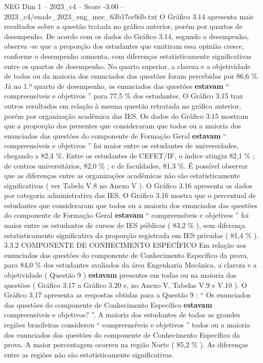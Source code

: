 \begin{textsample}{NEG Dim 1 – 2023\_c4 – Score -3.00 – 2023\_c4/enade\_2023\_eng\_mec\_63b17ce9db.txt}
O Gráfico 3.14 apresenta mais resultados sobre a questão tratada no gráfico anterior, porém por quartos de desempenho.
De acordo com os dados do Gráfico 3.14, segundo o desempenho, observa -se que a proporção dos estudantes que emitiram essa opinião cresce, conforme o desempenho aumenta, com diferenças estatisticamente significativas entre os quartos de desempenho.
No quarto superior, a clareza e a objetividade de todos ou da maioria dos enunciados das questões foram percebidas por 86,6 \%.
Já no 1.º quarto de desempenho, os enunciados das questões \textbf{estavam} “ compreensíveis e objetivos ” para 77,5 \% dos estudantes.
O Gráfico 3.15 traz outros resultados em relação à mesma questão retratada no gráfico anterior, porém por organização acadêmica das IES.
Os dados do Gráfico 3.15 mostram que a proporção dos presentes que consideraram que todos ou a maioria dos enunciados das questões do componente de Formação Geral \textbf{estavam} “ compreensíveis e objetivos ” foi maior entre os estudantes de universidades, chegando a 82,4 \%.
Entre os estudantes de CEFET/IF, o índice atingiu 82,1 \% ; de centros universitários, 82,0 \% ; e de faculdades, 81,3 \%.
É possível observar que as diferenças entre as organizações acadêmicas não são estatisticamente significativas ( ver Tabela V.8 no Anexo V ).
O Gráfico 3.16 apresenta os dados por categoria administrativa das IES.
O Gráfico 3.16 mostra que o percentual de estudantes que consideraram que todos ou a maioria dos enunciados das questões do componente de Formação Geral \textbf{estavam} “ compreensíveis e objetivos ” foi maior entre os estudantes de cursos de IES públicas ( 83,2 \% ), sem diferença estatisticamente significativa da proporção registrada em IES privadas ( 81,4 \% ). 3.3.2 COMPONENTE DE CONHECIMENTO ESPECÍFICO Em relação aos enunciados das questões do componente de Conhecimento Específico da prova, para 84,0 \% dos estudantes avaliados da área Engenharia Mecânica, a clareza e a objetividade ( Questão 9 ) \textbf{estavam} presentes em todas ou na maioria das questões ( Gráfico 3.17 a Gráfico 3.20 e, no Anexo V, Tabelas V.9 e V.10 ).
O Gráfico 3.17 apresenta as respostas obtidas para a Questão 9 : “ Os enunciados das questões do componente de Conhecimento Específico \textbf{estavam} compreensíveis e objetivos? ”.
A maioria dos estudantes de todas as grandes regiões brasileiras considerou “ compreensíveis e objetivos ” todos ou a maioria dos enunciados das questões do componente de Conhecimento Específico da prova.
A maior porcentagem ocorreu na região Norte ( 85,2 \% ).
As diferenças entre as regiões não são estatisticamente significativas.

\end{textsample}
